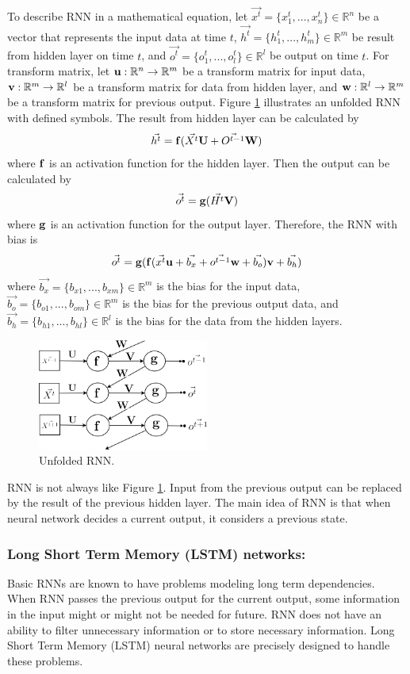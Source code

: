 \documentclass[draft,dvipsnames]{drexel-thesis}
\begin{document}
\begin{thesis}
	To describe RNN in a mathematical equation, let $\vec{x^t} = \{ x_1^t, ..., x_n^t\} \in \mathbb{R}^n$ be a vector that represents the input data at time $t$, $\vec{h^t} = \{ h_1^t, ..., h_m^t\} \in \mathbb{R}^m$ be result from hidden layer on time $t$, and $\vec{o^t} = \{ o_1^t, ..., o_l^t\} \in \mathbb{R}^l$ be output on time $t$. For transform matrix, let $\bold{u}: \mathbb{R}^n \rightarrow \mathbb{R}^m$ be a transform matrix for input data, $\bold{v}: \mathbb{R}^m \rightarrow \mathbb{R}^l$ be a transform matrix for data from hidden layer, and $\bold{w}: \mathbb{R}^l \rightarrow \mathbb{R}^m$ be a transform matrix for previous output. Figure \ref{fig:unfold_RNN} illustrates an unfolded RNN with defined symbols. The result from hidden layer can be calculated by
	$$\vec{h^t} = \bold{f}(\vec{X^t}\bold{U} + \vec{O^{t-1}}\bold{W})$$ where $\bold{f}$ is an activation function for the hidden layer. Then the output can be calculated by
	$$\vec{o^t} = \bold{g}(\vec{H^t}\bold{V})$$ where $\bold{g}$ is an activation function for the output layer. Therefore, the RNN with bias is
	$$\vec{o^t} = \bold{g}(\bold{f}(\vec{x^t}\bold{u}+\vec{b_x} + \vec{o^{t-1}}\bold{w}+\vec{b_o})\bold{v}+\vec{b_h})$$ where $\vec{b_x} = \{b_{x1}, ..., b_{xm}\} \in \mathbb{R}^m$ is the bias for the input data, $\vec{b_o} = \{b_{o1}, ..., b_{om}\} \in \mathbb{R}^m$ is the bias for the previous output data, and $\vec{b_h} = \{b_{h1}, ..., b_{hl}\} \in \mathbb{R}^l$ is the bias for the data from the hidden layers.

\begin{figure}[t!]
    \centering
    \includegraphics[width=0.5\textwidth]{pictures/figures/unfold_RNN.png}
    \caption{Unfolded RNN.}
    \label{fig:unfold_RNN}
\end{figure}

	RNN is not always like Figure \ref{fig:unfold_RNN}. Input from the previous output can be replaced by the result of the previous hidden layer. The main idea of RNN is that when neural network decides a current output, it considers a previous state.


\subsubsection{Long Short Term Memory (LSTM) networks:}\label{LSTM}
	Basic RNNs are known to have problems modeling long term dependencies. When RNN passes the previous output for the current output, some information in the input might or might not be needed for future. RNN does not have an ability to filter unnecessary information or to store necessary information. Long Short Term Memory (LSTM) neural networks are precisely designed to handle these problems.


\end{thesis}
\end{document}
